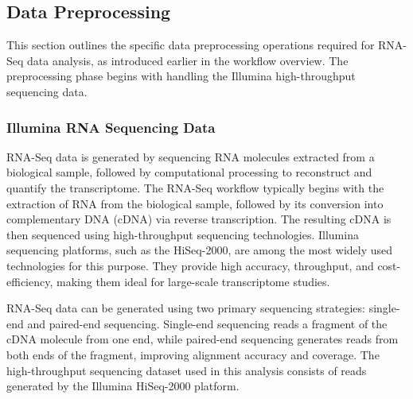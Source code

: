 \documentclass{article}
\begin{document}
\subsection{Data Preprocessing}
This section outlines the specific data preprocessing operations required for RNA-Seq data analysis, as introduced earlier in the workflow overview. The preprocessing phase begins with handling the Illumina high-throughput sequencing data.

\subsubsection{Illumina RNA Sequencing Data}
RNA-Seq data is generated by sequencing RNA molecules extracted from a biological sample, followed by computational processing to reconstruct and quantify the transcriptome. The RNA-Seq workflow typically begins with the extraction of RNA from the biological sample, followed by its conversion into complementary DNA (cDNA) via reverse transcription. The resulting cDNA is then sequenced using high-throughput sequencing technologies. Illumina sequencing platforms, such as the HiSeq-2000, are among the most widely used technologies for this purpose. They provide high accuracy, throughput, and cost-efficiency, making them ideal for large-scale transcriptome studies.

RNA-Seq data can be generated using two primary sequencing strategies: single-end and paired-end sequencing. Single-end sequencing reads a fragment of the cDNA molecule from one end, while paired-end sequencing generates reads from both ends of the fragment, improving alignment accuracy and coverage. The high-throughput sequencing dataset used in this analysis consists of reads generated by the Illumina HiSeq-2000 platform.
\end{document}
